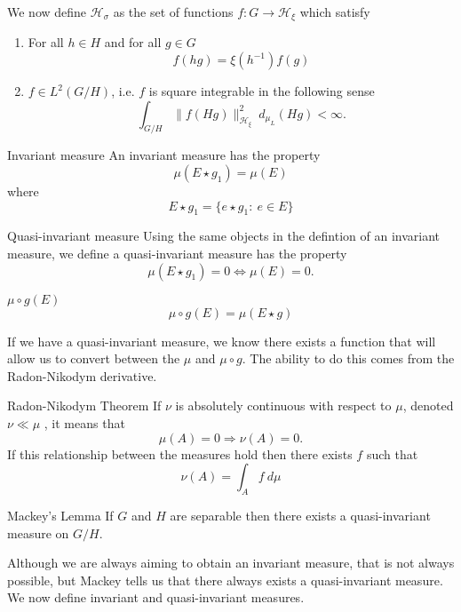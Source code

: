 \documentclass{article}
\begin{document}
We now define $\mathcal{H}_{\sigma}$ as the set of functions $f: G \rightarrow \mathcal{H}_{\xi}$ which satisfy
\begin{enumerate}
    \item For all $h \in H$ and for all $g \in G$ 
        \[ 
            f(hg) = \xi(h^{-1})f(g) 
        \]
    \item $f \in L^{2}(G/H)$, i.e. $f$ is square integrable in the following sense
        \[%
            \int_{G/H} \| f(Hg) \|^{2}_{\mathcal{H}_{\xi}} \ d_{\mu_{L}}(Hg) < \infty.
        \]%
\end{enumerate}

\begin{Define}{Invariant measure}
    An invariant measure has the property 
    \[ 
        \mu(E \star g_1) = \mu(E) 
    \] 
    where 
    \[ 
        E \star g_1  = \{ e \star g_1 : \ e \in E \} 
    \]
\end{Define}
\begin{Define}{Quasi-invariant measure}
    Using the same objects in the defintion of an invariant measure, we define a quasi-invariant measure has the property 
    \[ 
        \mu(E \star g_1) =0 \iff \mu(E) = 0 .
    \]
\end{Define}

\begin{Define}{$\mu \circ g (E)$}
    \[%
        \mu \circ g(E) = \mu(E \star g) 
    \]%
\end{Define}

If we have a quasi-invariant measure, we know there exists a function that will allow us to convert between the $\mu$ and $\mu \circ g$. The ability to do this comes from the Radon-Nikodym derivative. 

\begin{Theorem}{Radon-Nikodym Theorem}
    If $\nu$  is absolutely continuous with respect to $\mu$, denoted $\nu \ll \mu$ , it means that 
    \[%
        \mu(A) = 0 \Rightarrow \nu(A) = 0 .
    \]%
    If this relationship between the measures hold then there exists $f$  such that
    \[%
        \nu(A) = \int_{A} f \ d\mu 
    \]%
\end{Theorem}

\begin{Theorem}{Mackey's Lemma}
    If $G$ and $H$ are separable then there exists a quasi-invariant measure on $G/H$.\QED
\end{Theorem}

Although we are always aiming to obtain an invariant measure, that is not always possible, but Mackey tells us that there always exists a quasi-invariant measure. We now define invariant and quasi-invariant measures. 
\end{document}
